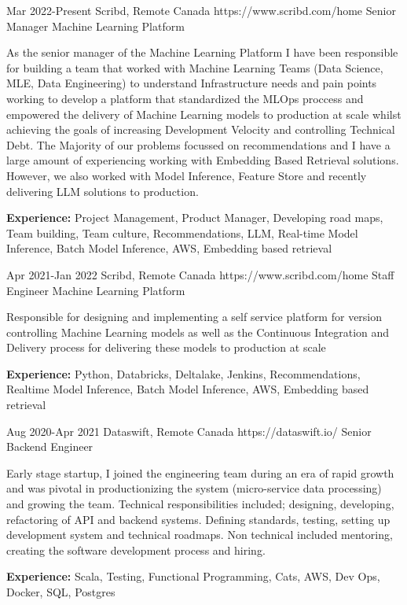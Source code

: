\documentclass{article}
\begin{document}
\begin{job}
{Mar 2022-}{Present}
{Scribd, Remote Canada}
{https://www.scribd.com/home}
{Senior Manager Machine Learning Platform}%
{As the senior manager of the Machine Learning Platform I have been responsible for building a team that worked with Machine Learning Teams (Data Science, MLE, Data Engineering) to understand Infrastructure needs and pain points working to develop a platform that standardized the MLOps proccess and empowered the delivery of Machine Learning models to production at scale whilst achieving the goals of increasing Development Velocity and controlling Technical Debt. The Majority of our problems focussed on recommendations and I have a large amount of experiencing working with Embedding Based Retrieval solutions. However, we also worked with Model Inference, Feature Store and recently delivering LLM solutions to production. \\
\rule{0mm}{5mm}\textbf{Experience:} Project Management, Product Manager, Developing road maps, Team building, Team culture, Recommendations, LLM, Real-time Model Inference, Batch Model Inference, AWS, Embedding based retrieval }
\end{job}


\begin{job}
{Apr 2021-}{Jan 2022}
{Scribd, Remote Canada}
{https://www.scribd.com/home}
{Staff Engineer Machine Learning Platform}%
{Responsible for designing and implementing a self service platform for version controlling Machine Learning models as well as the Continuous Integration and Delivery process for delivering these models to production at scale \\
\rule{0mm}{5mm}\textbf{Experience:} Python, Databricks, Deltalake, Jenkins, Recommendations, Realtime Model Inference, Batch Model Inference, AWS, Embedding based retrieval }
\end{job}


\begin{job}
{Aug 2020-}{Apr 2021}
{Dataswift, Remote Canada}
{https://dataswift.io/}
{Senior Backend Engineer}%
{Early stage startup, I joined the engineering team during an era of rapid growth and was pivotal in productionizing the system (micro-service data processing) and growing the team. Technical responsibilities included; designing, developing, refactoring of API and backend systems. Defining standards, testing, setting up development system and technical roadmaps. Non technical included  mentoring, creating the software development process and hiring.  \\
\rule{0mm}{5mm}\textbf{Experience:} Scala, Testing, Functional Programming, Cats, AWS, Dev Ops, Docker, SQL, Postgres}
\end{job}
\end{document}
